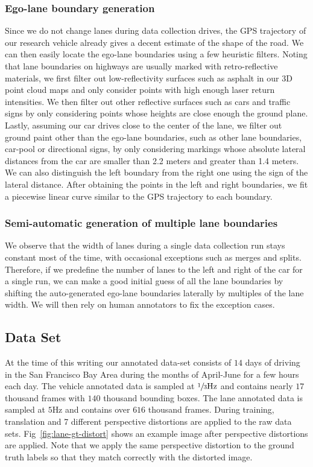 \documentclass[journal]{IEEEtran}
\begin{document}
\subsubsection{Ego-lane boundary generation}
Since we do not change lanes during data collection drives, the GPS trajectory of our research vehicle already gives a decent estimate of the shape of the road. We can then easily locate the ego-lane boundaries using a few heuristic filters. Noting that lane boundaries on highways are usually marked with retro-reflective materials, we first filter out low-reflectivity surfaces such as asphalt in our 3D point cloud maps and only consider points with high enough laser return intensities. We then filter out other reflective surfaces such as cars and traffic signs by only considering points whose heights are close enough the ground plane.  Lastly, assuming our car drives close to the center of the lane, we filter out ground paint other than the ego-lane boundaries, such as other lane boundaries, car-pool or directional signs, by only considering markings whose absolute lateral distances from the car are smaller than 2.2 meters and greater than 1.4 meters. We can also distinguish the left boundary from the right one using the sign of the lateral distance. After obtaining the points in the left and right boundaries, we fit a piecewise linear curve similar to the GPS trajectory to each boundary.

\subsubsection{Semi-automatic generation of multiple lane boundaries}
We observe that the width of lanes during a single data collection run stays constant most of the time, with occasional exceptions such as merges and splits. Therefore, if we predefine the number of lanes to the left and right of the car for a single run, we can make a good initial guess of all the lane boundaries by shifting the auto-generated ego-lane boundaries laterally by multiples of the lane width. We will then rely on human annotators to fix the exception cases.

\subsection{Data Set}
At the time of this writing our annotated data-set consists of $14$ days of driving in the San Francisco Bay Area during the months of April-June for a few hours each day. The vehicle annotated data is sampled at $\sfrac{1}{3} \text{Hz}$ and contains nearly $17$ thousand frames with $140$ thousand bounding boxes. The lane annotated data is sampled at $5\text{Hz}$ and contains over $616$ thousand frames. During training, translation and 7 different perspective distortions are applied to the raw data sets. Fig~\ref{fig:lane-gt-distort} shows an example image after perspective distortions are applied. Note that we apply the same perspective distortion to the ground truth labels so that they match correctly with the distorted image.
\end{document}
